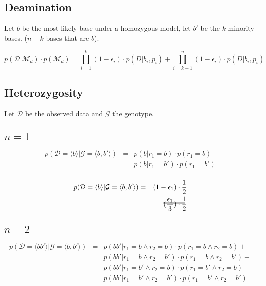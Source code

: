 \documentclass[a4paper,12pt]{article}
\newcommand\hcancel[2][black]{\setbox0=\hbox{$#2$}%
\rlap{\raisebox{.45\ht0}{\textcolor{#1}{\rule{\wd0}{1pt}}}}#2}
\begin{document}
\subsection{Deamination}
Let $b$ be the most likely base under a homozygous model, let $b'$ be the $k$ minority bases. ($n-k$ bases that are $b$). 

\begin{equation}
p(\mathcal{D}  | \mathcal{M}_{d} ) \cdot p(\mathcal{M}_{d} ) =  \prod_{i=1}^k (1-\epsilon_i) \cdot p(D|b_i,p_i )  + \prod_{i=k+1}^n ({1-\epsilon_i}) \cdot p(D|b_i,p_i )
\end{equation}


\subsection{Heterozygosity}

Let $\mathcal{D}$ be the observed data and $\mathcal{G}$ the genotype. 

\subsection{$n=1$}

\begin{eqnarray*}
p(\mathcal{D} = \langle b \rangle | \mathcal{G} = \langle b,b' \rangle) & = & p( b | r_1 = b   )   \cdot p( r_1 =  b) \\
                                                                        &   & p( b | r_1 = b'   )   \cdot p( r_1 =  b')  \\
\end{eqnarray*}

\begin{eqnarray*}
p(\mathcal{D} = \langle b \rangle | \mathcal{G} = \langle b,b' \rangle) &  = & ( 1-\epsilon_1)   \cdot \frac {1} {2} \\
                                                                        &    & \hcancel{  (\frac{ \epsilon_1} {3} ) \cdot \frac {1} {2}} \\
\end{eqnarray*}

\subsection{$n=2$}
\begin{eqnarray*}
p(\mathcal{D} = \langle bb' \rangle| \mathcal{G} = \langle b,b' \rangle) & = &  p( bb' | r_1 = b  \land r_2 = b  )   \cdot p( r_1 =  b \land r_2 =  b)  + \\
                             &   &  p( bb' | r_1 = b  \land r_2 = b' )   \cdot p( r_1 =  b \land r_2 =  b')  +     \\
                             &   &  p( bb' | r_1 = b' \land r_2 = b  )   \cdot p( r_1 =  b' \land r_2 =  b)  +     \\
                             &   &  p( bb' | r_1 = b' \land r_2 = b' )   \cdot p( r_1 =  b' \land r_2 =  b')       \\                             
\end{eqnarray*}
\end{document}
